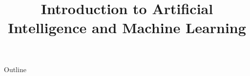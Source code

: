 \documentclass[xcolor=dvipsnames,compress,t,pdf,notes,9pt]{beamer}
\title[\insertframenumber /\inserttotalframenumber]{Introduction to Artificial Intelligence and Machine Learning}
\begin{document}
	\begin{frame}
	\titlepage
	\end{frame}
	
	\begin{frame}{Outline}
	    \tableofcontents
	\end{frame}

	
	
	
\end{document}
